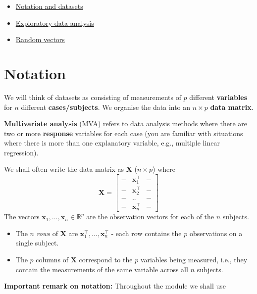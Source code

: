 \documentclass[
]{book}
\providecommand{\tightlist}{%
  \setlength{\itemsep}{0pt}\setlength{\parskip}{0pt}}
\theoremstyle{definition}
\theoremstyle{definition}
\theoremstyle{definition}
\theoremstyle{definition}
\theoremstyle{remark}
\begin{document}
\begin{itemize}
\tightlist
\item
  \href{https://mediaspace.nottingham.ac.uk/media/Notation+and+Datasets/1_p2nas9i4}{Notation and datasets}
\item
  \href{https://mediaspace.nottingham.ac.uk/media/Exploratory+data+analysis/1_seh9o28a}{Exploratory data analysis}
\item
  \href{https://mediaspace.nottingham.ac.uk/media/Random+Vectors/1_fpq4r9wh}{Random vectors}
\end{itemize}

\section{Notation}\label{notation}

We will think of datasets as consisting of measurements of \(p\) different \textbf{variables} for \(n\) different \textbf{cases/subjects}. We organise the data into an \(n \times p\) \textbf{data matrix}.

\textbf{Multivariate analysis} (MVA) refers to data analysis methods where there are two or more \textbf{response} variables for each case (you are familiar with situations where there is more than one explanatory variable, e.g., multiple linear regression).

We shall often write the data matrix as \(\mathbf X\) (\(n \times p\)) where
\[
{\mathbf X}=\left[ \begin{array}{ccc}
- &\mathbf x_1^\top&-\\
- &\mathbf x_2^\top&-\\
- &..&-\\
- &\mathbf x_n^\top&-
\end{array}\right ]
\]
The vectors \(\mathbf x_1, \ldots , \mathbf x_n \in \mathbb{R}^p\) are the observation vectors for each of the \(n\) subjects.

\begin{itemize}
\tightlist
\item
  The \(n\) \emph{rows} of \(\mathbf X\) are \(\mathbf x_1^\top, \ldots , \mathbf x_n^\top\) - each row contains the \(p\) observations on a single subject.
\item
  The \(p\) columns of \(\mathbf X\) correspond to the \(p\) variables being measured, i.e., they contain the measurements of the same variable across all \(n\) subjects.
\end{itemize}

\textbf{Important remark on notation:} Throughout the module we shall use
\end{document}
